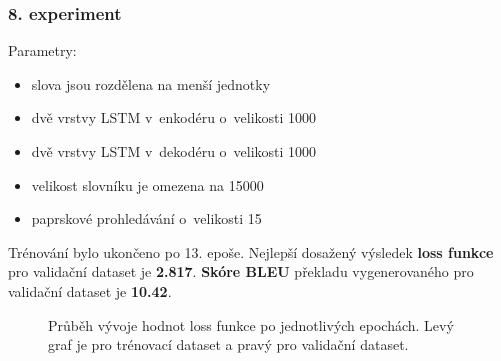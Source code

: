 \subsubsection{8. experiment}\label{experiment8}
Parametry:
\begin{itemize}
  \item slova jsou rozdělena na menší jednotky
  \item dvě vrstvy LSTM v~enkodéru o~velikosti 1000
  \item dvě vrstvy LSTM v~dekodéru o~velikosti 1000
  \item velikost slovníku je omezena na 15000
  \item paprskové prohledávání o~velikosti 15
\end{itemize}

Trénování bylo ukončeno po 13. epoše. Nejlepší dosažený výsledek \textbf{loss funkce} pro validační dataset je \textbf{2.817}. \textbf{Skóre BLEU} překladu vygenerovaného pro validační dataset je \textbf{10.42}.

\begin{figure}[H]
    \begin{center}
    \end{center}
	\caption{Průběh vývoje hodnot loss funkce po jednotlivých epochách. Levý graf je pro trénovací dataset a pravý pro validační dataset.}
\end{figure}

